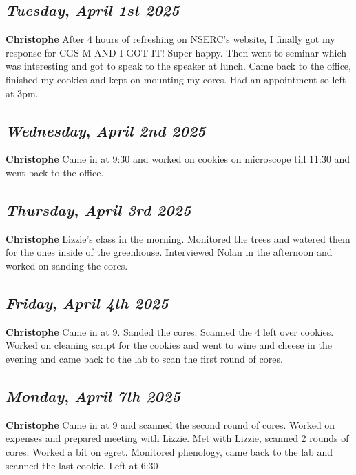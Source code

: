 \begin{center}
\section*{\month}
\end{center}

\def\day{\textit{April 1st 2025}}
\def\weekday{\textit{Tuesday}}
\subsection*{\weekday, \day}
\textbf {Christophe}
After 4 hours of refreshing on NSERC's website, I finally got my response for CGS-M AND I GOT IT! Super happy. Then went to seminar which was interesting and got to speak to the speaker at lunch. Came back to the office, finished my cookies and kept on mounting my cores. Had an appointment so left at 3pm.

\def\day{\textit{April 2nd 2025}}
\def\weekday{\textit{Wednesday}}
\subsection*{\weekday, \day}
\textbf {Christophe}
Came in at 9:30 and worked on cookies on microscope till 11:30 and went back to the office. 

\def\day{\textit{April 3rd 2025}}
\def\weekday{\textit{Thursday}}
\subsection*{\weekday, \day}
\textbf {Christophe}
Lizzie's class in the morning. Monitored the trees and watered them for the ones inside of the greenhouse. Interviewed Nolan in the afternoon and worked on sanding the cores.

\def\day{\textit{April 4th 2025}}
\def\weekday{\textit{Friday}}
\subsection*{\weekday, \day}
\textbf {Christophe}
Came in at 9. Sanded the cores. Scanned the 4 left over cookies. Worked on cleaning script for the cookies and went to wine and cheese in the evening and came back to the lab to scan the first round of cores.

\def\day{\textit{April 7th 2025}}
\def\weekday{\textit{Monday}}
\subsection*{\weekday, \day}
\textbf {Christophe}
Came in at 9 and scanned the second round of cores. Worked on expenses and prepared meeting with Lizzie. Met with Lizzie, scanned 2 rounds of cores. Worked a bit on egret. Monitored phenology, came back to the lab and scanned the last cookie. Left at 6:30


